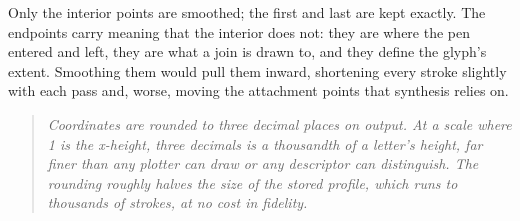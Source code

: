Only the interior points are smoothed; the first and last are kept exactly. The endpoints carry meaning that the interior does not: they are where the pen entered and left, they are what a join is drawn to, and they define the glyph's extent. Smoothing them would pull them inward, shortening every stroke slightly with each pass and, worse, moving the attachment points that synthesis relies on.


\begin{quote}\small\itshape Coordinates are rounded to three decimal places on output. At a scale where 1 is the x-height, three decimals is a thousandth of a letter's height, far finer than any plotter can draw or any descriptor can distinguish. The rounding roughly halves the size of the stored profile, which runs to thousands of strokes, at no cost in fidelity.\end{quote}

